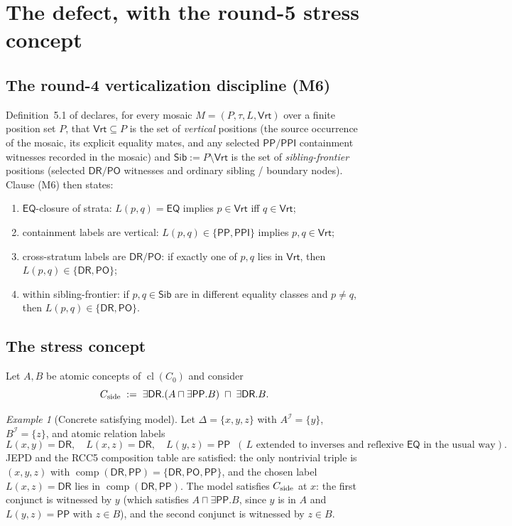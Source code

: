 \documentclass[11pt]{article}
\theoremstyle{definition}
\theoremstyle{remark}
\newtheorem{example}[theorem]{Example}
\newcommand{\DR}{\mathsf{DR}}
\newcommand{\PO}{\mathsf{PO}}
\newcommand{\PP}{\mathsf{PP}}
\newcommand{\PPI}{\mathsf{PPI}}
\newcommand{\EQ}{\mathsf{EQ}}
\newcommand{\comp}{\operatorname{comp}}
\newcommand{\Vrt}{\mathsf{Vrt}}
\newcommand{\Sib}{\mathsf{Sib}}
\newcommand{\Cl}{\operatorname{cl}}
\begin{document}
\section{The defect, with the round-5 stress concept}
\label{sec:defect}

\subsection{The round-4 verticalization discipline (M6)}

Definition~5.1 of \cite{GPT55Repaired} declares, for every mosaic
$M=(P,\tau,L,\Vrt)$ over a finite position set $P$, that
$\Vrt\subseteq P$ is the set of \emph{vertical} positions (the
source occurrence of the mosaic, its explicit equality mates, and any
selected $\PP/\PPI$ containment witnesses recorded in the mosaic) and
$\Sib:=P\setminus\Vrt$ is the set of \emph{sibling-frontier}
positions (selected $\DR/\PO$ witnesses and ordinary sibling /
boundary nodes).  Clause (M6) then states:

\begin{enumerate}[label=(M6.\alph*)]
\item $\EQ$-closure of strata: $L(p,q)=\EQ$ implies $p\in\Vrt$ iff $q\in\Vrt$;
\item containment labels are vertical: $L(p,q)\in\{\PP,\PPI\}$ implies $p,q\in\Vrt$;
\item cross-stratum labels are $\DR/\PO$: if exactly one of $p,q$ lies in $\Vrt$, then $L(p,q)\in\{\DR,\PO\}$;
\item within sibling-frontier: if $p,q\in\Sib$ are in different equality classes and $p\neq q$, then $L(p,q)\in\{\DR,\PO\}$.
\end{enumerate}

\subsection{The stress concept}
\label{ssec:stress}

Let $A,B$ be atomic concepts of $\Cl(C_0)$ and consider
\[
  C_{\rm side}\;:=\;\exists\DR.(A\sqcap\exists\PP.B)\;\sqcap\;\exists\DR.B.
\]

\begin{example}[Concrete satisfying model]\label{ex:stress-model}
Let $\Delta=\{x,y,z\}$ with $A^{\mathcal{I}}=\{y\}$,
$B^{\mathcal{I}}=\{z\}$, and atomic relation labels
\[
  L(x,y)=\DR,\quad L(x,z)=\DR,\quad L(y,z)=\PP
  \;\;(\,L\text{ extended to inverses and reflexive }\EQ\text{ in the usual way}).
\]
JEPD and the RCC5 composition table are satisfied: the only nontrivial
triple is $(x,y,z)$ with $\comp(\DR,\PP)=\{\DR,\PO,\PP\}$, and the
chosen label $L(x,z)=\DR$ lies in $\comp(\DR,\PP)$.  The model
satisfies $C_{\rm side}$ at $x$: the first conjunct is witnessed by
$y$ (which satisfies $A\sqcap\exists\PP.B$, since $y$ is in $A$ and
$L(y,z)=\PP$ with $z\in B$), and the second conjunct is witnessed by
$z\in B$.
\end{example}
\end{document}
